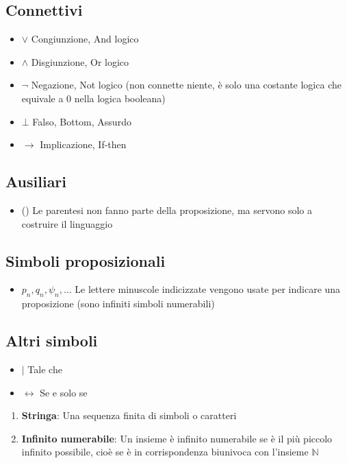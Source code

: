\documentclass{article}
\theoremstyle{break}
\theoremstyle{break}
\theoremstyle{break}
\theoremstyle{break}
\begin{document}
\subsection{Connettivi}
\begin{itemize}
	\item \( \vee \) Congiunzione, And logico
	\item \( \wedge \) Disgiunzione, Or logico
	\item \( \neg \) Negazione, Not logico (non connette niente, è solo una costante logica
	      che equivale a 0 nella logica booleana)
	\item \( \bot \) Falso, Bottom, Assurdo
	\item \( \to  \) Implicazione, If-then
\end{itemize}

\subsection{Ausiliari}
\begin{itemize}
	\item () Le parentesi non fanno parte della proposizione,
	      ma servono solo a costruire il linguaggio
\end{itemize}

\subsection{Simboli proposizionali}
\begin{itemize}
	\item \( p_n, q_n, \psi_n, \ldots  \) Le lettere minuscole indicizzate vengono usate per indicare
	      una proposizione (sono infiniti simboli numerabili)
\end{itemize}

\subsection{Altri simboli}
\begin{itemize}
	\item \( | \) Tale che
	\item \( \leftrightarrow \) Se e solo se
\end{itemize}

\begin{define}
	\begin{enumerate}
		\item \textbf{Stringa}: Una sequenza finita di simboli o caratteri
		\item \textbf{Infinito numerabile}: Un insieme è infinito numerabile se è il
		      più piccolo infinito possibile, cioè se è in corrispondenza
		      biunivoca con l'insieme \( \mathbb{N} \)
	\end{enumerate}
\end{define}
\end{document}
